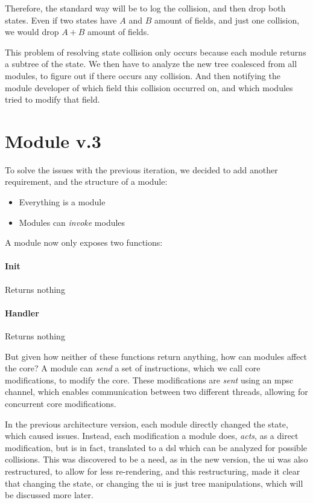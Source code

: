 Therefore, the standard way will be to log the collision, and then drop both
states. Even if two states have $A$ and $B$ amount of fields, and just one
collision, we would drop $A + B$ amount of fields.

This problem of resolving state collision only occurs because each module
returns a subtree of the state. We then have to analyze the new tree coalesced
from all modules, to figure out if there occurs any collision. And then
notifying the module developer of which field this collision occurred on, and
which modules tried to modify that field.


\section{Module v.3} \label{sec:moD3}

To solve the issues with the previous iteration, we decided to add another
requirement, and the structure of a module:

\begin{itemize}
  \item Everything is a module
  \item Modules can \textit{invoke} modules
\end{itemize}

A module now only exposes two functions:

\paragraph{Init} Returns nothing

\paragraph{Handler} Returns nothing

But given how neither of these functions return anything, how can modules affect
the core? A module can \textit{send} a set of instructions, which we call core
modifications, to modify the core. These modifications are \textit{sent} using
an \gls*{mpsc} channel, which enables communication between two different
threads, allowing for concurrent core modifications.

In the previous architecture version, each module directly changed the state,
which caused issues. Instead, each modification a module does, \textit{acts}, as
a direct modification, but is in fact, translated to a \gls*{dsl} which can be
analyzed for possible collisions. This was discovered to be a need, as in the
new version, the \gls*{ui} was also restructured, to allow for less
re-rendering, and this restructuring, made it clear that changing the state, or
changing the \gls*{ui} is just tree manipulations, which will be discussed more
later.


